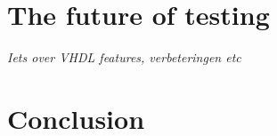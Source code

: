\documentclass[11pt,british]{article}
\begin{document}
%
%

\newpage{}
\section{The future of testing}
\emph{\color{red} Iets over VHDL features, verbeteringen etc}

\newpage{}
\section{Conclusion}

\pagebreak{}

\printbibliography

\newpage{}
\end{document}
